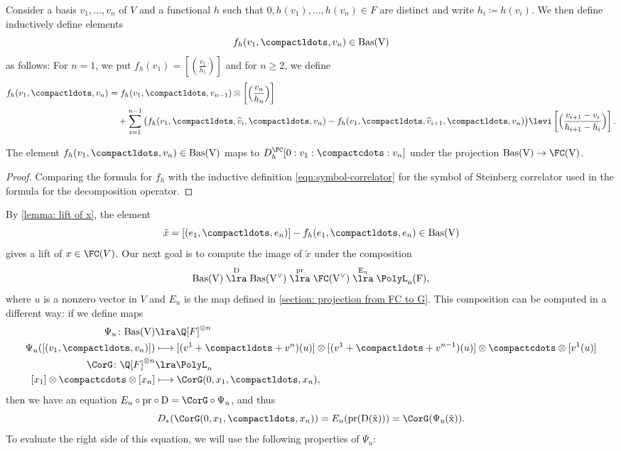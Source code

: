 \documentclass[a4paper]{amsart}
\begin{document}
\smallskip

Consider a basis $v_1,\dots,v_n$ of $V$ and a functional $h$ such that $0, h(v_1),\dots,h(v_n)\in F$ are distinct and write $h_i \coloneq h(v_i)$. We then define inductively define elements
\[
f_h(v_1,\compactldots,v_n)\in \rm{Bas}(V)
\]
as follows: For $n=1$, we put $f_h(v_1)=[(\tfrac{v_1}{h_1})]$ and for $n\geq 2$, we define
\begin{equation*}\begin{aligned}
f_h(v_1,\compactldots,v_n) &= f_h(v_1,\compactldots,v_{n-1})\otimes \left[\Bigl(\frac{v_n}{h_n}\Bigr)\right] \\
&\quad +\sum_{i=1}^{n-1} \big(f_h(v_1,\compactldots,\widehat{v}_i,\compactldots,v_n)-f_h(v_1,\compactldots,\widehat{v}_{i+1},\compactldots,v_n)\big)\levi \left[\Bigl(\frac{v_{i+1}-v_i}{h_{i+1}-h_i}\Bigr)\right].
\end{aligned}\end{equation*} 

\begin{lemma}\label{lemma: lift of x} The element $f_h(v_1,\compactldots,v_n)\in \rm{Bas}(V)$ maps to $D^\FC_h[0:v_1:\compactcdots:v_n]$ under the projection $\rm{Bas}(V) \to \FC(V)$.
\end{lemma}

\begin{proof}
Comparing the formula for $f_h$ with the inductive definition \eqref{eqn:symbol-correlator} for the symbol of Steinberg correlator used in the formula for the decomposition operator.
\end{proof}

By \cref{lemma: lift of x}, the element 
\[
\tilde{x}=[(e_1,\compactldots,e_n)]-f_h(e_1,\compactldots,e_n)\in \rm{Bas}(V)
\]
gives a lift of $x\in \FC(V)$.  Our next goal is to compute the image of $\tilde{x}$ under the composition
\[
\rm{Bas}(V) \stackrel{D}{\lra} \rm{Bas}(V^{\vee})\stackrel{\rm{pr}}{\lra} \FC(V^{\vee}) \stackrel{E_u}{\lra} \PolyL_n(F),
\]
where $u$ is a nonzero vector in $V$ and $E_u$ is the map defined in \cref{section: projection from FC to G}. This composition can be computed in a different way: if we define maps
\begin{align*}\Psi_u\colon \rm{Bas}(V) &\lra \Q[F]^{\otimes n} \\
\Psi_u([(v_1,\compactldots,v_n)])&\longmapsto [(v^1+\compactldots+ v^n)(u)]\otimes [(v^1+\compactldots+ v^{n-1})(u)]\otimes \compactcdots \otimes [v^1(u)] \\
\CorG \colon  \Q[F]^{\otimes n} &\lra \PolyL_n \\
[x_1]\otimes  \compactcdots \otimes [x_n] &\longmapsto \CorG(0,x_1,\compactldots,x_n),\end{align*}
then we have an equation $E_u\circ \rm{pr} \circ D = \CorG \circ \Psi_u$, and thus
\[
D_*(\CorG(0,x_1,\compactldots,x_n))=E_u(\rm{pr}(D(\tilde{x})))= \CorG(\Psi_u(\tilde{x})).
\]
To evaluate the right side of this equation, we will use the following properties of $\Psi_u$:
\end{document}
